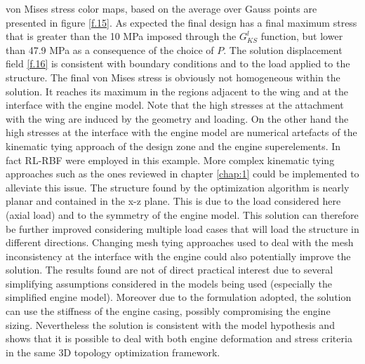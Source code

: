  von Mises stress color maps, based on the average over Gauss points are presented in figure \ref{f.15}.
  As expected the final design has a final maximum stress that is greater than the 10 MPa imposed through the $G_{KS}^l$ function, but lower than 47.9 MPa as a consequence of the choice of $P$.
  The solution displacement field \ref{f.16} is consistent with boundary conditions and to the load applied to the structure. The final von Mises stress is obviously not homogeneous within the solution. It reaches its maximum in the regions adjacent to the wing and at the interface with the engine model. Note that the high stresses at the attachment with the wing are induced by the geometry and loading. On the other hand the high stresses at the interface with the engine model are numerical artefacts of the kinematic tying approach of the design zone and the engine superelements. In fact RL-RBF were employed in this example. More complex kinematic tying approaches such as the ones reviewed in chapter \ref{chap:1} could be implemented to alleviate this issue.
  The structure found by the optimization algorithm is nearly planar and contained in the x-z plane. This is due to the load considered here (axial load) and to the symmetry of the engine model. This solution can therefore be further improved considering multiple load cases that will load the structure in different directions. Changing mesh tying approaches used to deal with the mesh inconsistency at the interface with the engine could also potentially improve the solution. The results found are not of direct practical interest due to several simplifying assumptions considered in the models being used (especially the simplified engine model). Moreover due to the formulation adopted, the solution can use the stiffness of the engine casing, possibly compromising the engine sizing. Nevertheless the solution is consistent with the model hypothesis and shows that it is possible to deal with both engine deformation and stress criteria in the same 3D topology optimization framework.
